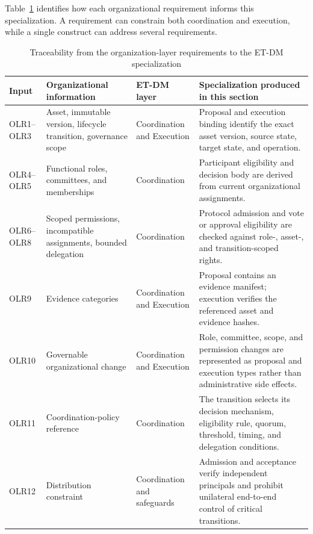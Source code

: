 \documentclass[journal]{IEEEtran}
\begin{document}
Table~\ref{tab:olr_etdm_mapping} identifies how each organizational
requirement informs this specialization. A requirement can
constrain both coordination and execution, while a single
construct can address several requirements.

\begin{table}[t]
\caption{Traceability from the organization-layer requirements
to the ET-DM specialization}
\label{tab:olr_etdm_mapping}
\centering
\renewcommand{\arraystretch}{1.12}
\setlength{\tabcolsep}{4pt}
\begin{tabular}{p{1.8cm}p{4.1cm}p{3.3cm}p{7.0cm}}
\hline
\textbf{Input} &
\textbf{Organizational information} &
\textbf{ET-DM layer} &
\textbf{Specialization produced in this section}\\
\hline

OLR1--OLR3 &
Asset, immutable version, lifecycle transition, governance scope &
Coordination and Execution &
Proposal and execution binding identify the exact asset version,
source state, target state, and operation.\\

OLR4--OLR5 &
Functional roles, committees, and memberships &
Coordination &
Participant eligibility and decision body are derived from
current organizational assignments.\\

OLR6--OLR8 &
Scoped permissions, incompatible assignments, bounded delegation &
Coordination &
Protocol admission and vote or approval eligibility are checked
against role-, asset-, and transition-scoped rights.\\

OLR9 &
Evidence categories &
Coordination and Execution &
Proposal contains an evidence manifest; execution verifies
the referenced asset and evidence hashes.\\

OLR10 &
Governable organizational change &
Coordination and Execution &
Role, committee, scope, and permission changes are represented
as proposal and execution types rather than administrative
side effects.\\

OLR11 &
Coordination-policy reference &
Coordination &
The transition selects its decision mechanism, eligibility rule,
quorum, threshold, timing, and delegation conditions.\\

OLR12 &
Distribution constraint &
Coordination and safeguards &
Admission and acceptance verify independent principals and
prohibit unilateral end-to-end control of critical transitions.\\

\hline
\end{tabular}
\end{table}
\end{document}
